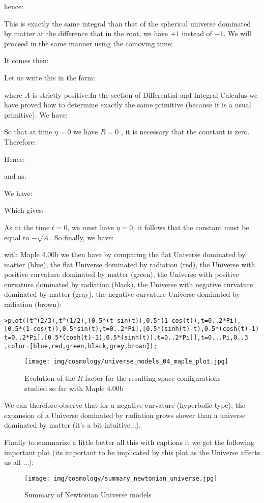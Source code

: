 	hence:
	
	This is exactly the same integral than that of the spherical universe dominated by matter at the difference that in the root, we have $+1$ instead of $-1$. We will proceed in the same manner using the comoving time:
	
	It comes then:
	
	Let us write this in the form:
	
	where $A$ is strictly positive.In the section of Differential and Integral Calculus we have proved how to determine exactly the same primitive (because it is a usual primitive). We have:
	
	So that at time $\eta=0$ we have $R=0$ , it is necessary that the constant is zero. Therefore:
	
	Hence:
	
	and as:
	
	We have:
	
	Which gives:
	
	As at the time $t=0$, we must have $\eta=0$, it follows that the constant must be equal to $-\sqrt{A}$. So finally, we have:
	
	with Maple 4.00b we then have by comparing the flat Universe dominated by matter (blue), the flat Universe dominated by radiation (red), the Universe with positive curvature dominated by matter (green), the Universe with positive curvature dominated by radiation (black), the Universe with negative curvature dominated by matter (gray), the negative curvature Universe dominated by radiation (brown):
	
	\texttt{>plot([t\string^(2/3),t\string^(1/2),[0.5*(t-sin(t)),0.5*(1-cos(t)),t=0..2*Pi],}\\
	\texttt{[0.5*(1-cos(t)),0.5*sin(t),t=0..2*Pi],[0.5*(sinh(t)-t),0.5*(cosh(t)-1)}\\
	\texttt{t=0..2*Pi],[0.5*(cosh(t)-1),0.5*(sinh(t)),t=0..2*Pi]],t=0...Pi,0..3
,color=[blue,red,green,black,grey,brown]);}
	\begin{figure}[H]
		\centering
		\texttt{[image: img/cosmology/universe\_models\_04\_maple\_plot.jpg]}
		\caption[]{Evolution of the $R$ factor for the resulting space configurations studied so far with Maple 4.00b}
	\end{figure}
	We can therefore observe that for a negative curvature (hyperbolic type), the expansion of a Universe dominated by radiation grows slower than a universe dominated by matter (it's a bit intuitive...).

	Finally to summarize a little better all this with captions it we get the following important plot (its important to be implicated by this plot as the Universe affects us all ...):
	\begin{figure}[H]
		\centering
		\texttt{[image: img/cosmology/summary\_newtonian\_universe.jpg]}
		\caption{Summary of Newtonian Universe models}
	\end{figure}
	
